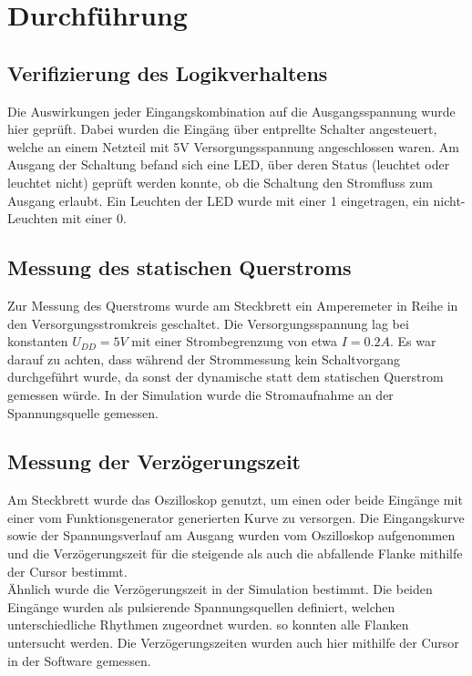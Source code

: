 \documentclass[11pt, a4paper]{article}
\begin{document}
\section*{Durchführung}

\subsection*{Verifizierung des Logikverhaltens}

Die Auswirkungen jeder Eingangskombination auf die Ausgangsspannung wurde hier geprüft. Dabei wurden die Eingäng über entprellte Schalter angesteuert, welche an einem Netzteil mit 5V Versorgungsspannung angeschlossen waren. Am Ausgang der Schaltung befand sich eine LED, über deren Status (leuchtet oder leuchtet nicht) geprüft werden konnte, ob die Schaltung den Stromfluss zum Ausgang erlaubt. Ein Leuchten der LED wurde mit einer 1 eingetragen, ein nicht-Leuchten mit einer 0.

\subsection*{Messung des statischen Querstroms}

Zur Messung des Querstroms wurde am Steckbrett ein Amperemeter in Reihe in den Versorgungsstromkreis geschaltet.
Die Versorgungsspannung lag bei konstanten $U_{DD} = 5V$ mit einer Strombegrenzung von etwa $I = 0.2A$. Es war darauf zu achten, dass während der Strommessung kein Schaltvorgang durchgeführt wurde, da sonst der dynamische statt dem statischen Querstrom gemessen würde.
In der Simulation wurde die Stromaufnahme an der Spannungsquelle gemessen. 

\subsection*{Messung der Verzögerungszeit}

Am Steckbrett wurde das Oszilloskop genutzt, um einen oder beide Eingänge mit einer vom Funktionsgenerator generierten Kurve zu versorgen. Die Eingangskurve sowie der Spannungsverlauf am Ausgang wurden vom Oszilloskop aufgenommen und die Verzögerungszeit für die steigende als auch die abfallende Flanke mithilfe der Cursor bestimmt. \\

Ähnlich wurde die Verzögerungszeit in der Simulation bestimmt. Die beiden Eingänge wurden als pulsierende Spannungsquellen definiert, welchen unterschiedliche Rhythmen zugeordnet wurden. so konnten alle Flanken untersucht werden. Die Verzögerungszeiten wurden auch hier mithilfe der Cursor in der Software gemessen.
\end{document}
